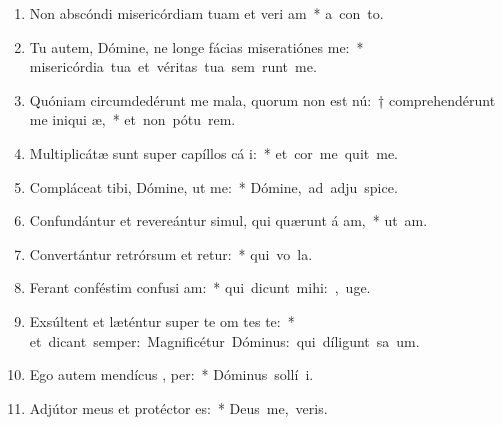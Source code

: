 \begin{flushleft}
\begin{enumerate}[leftmargin=*]
\item Non abscóndi misericórdiam tuam et veri am~* \mbox{a con to.}
\item Tu autem, Dómine, ne longe fácias miseratiónes   me:~* \mbox{misericórdia tua et véritas tua sem runt me.}
\item Quóniam circumdedérunt me mala, quorum non est nú:~† comprehendérunt me iniqui æ,~* \mbox{et non pótu  rem.}
\item Multiplicátæ sunt super capíllos cá i:~* \mbox{et cor me quit me.}
\item Compláceat tibi, Dómine, ut  me:~* \mbox{Dómine, ad adju  spice.}
\item Confundántur et revereántur simul, qui quærunt á am,~* \mbox{ut  am.}
\item Convertántur retrórsum et retur:~* \mbox{qui vo  la.}
\item Ferant conféstim confusi am:~* \mbox{qui dicunt mihi: , uge.}
\item Exsúltent et læténtur super te om tes te:~* \mbox{et dicant semper: Magnificétur Dóminus: qui díligunt sa um.}
\item Ego autem mendícus ,  per:~* \mbox{Dóminus sollí  i.}
\item Adjútor meus et protéctor   es:~* \mbox{Deus me,  veris.}

\end{enumerate}
\end{flushleft}


